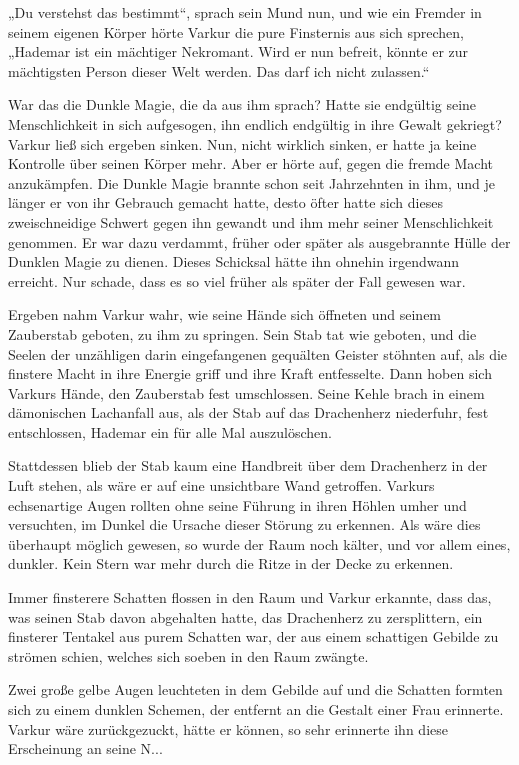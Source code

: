 „Du verstehst das bestimmt“, sprach sein Mund nun, und wie ein Fremder in seinem eigenen Körper hörte Varkur die pure Finsternis aus sich sprechen, „Hademar ist ein mächtiger Nekromant. Wird er nun befreit, könnte er zur mächtigsten Person dieser Welt werden. Das darf ich nicht zulassen.“

War das die Dunkle Magie, die da aus ihm sprach? Hatte sie endgültig seine Menschlichkeit in sich aufgesogen, ihn endlich endgültig in ihre Gewalt gekriegt? Varkur ließ sich ergeben sinken. Nun, nicht wirklich sinken, er hatte ja keine Kontrolle über seinen Körper mehr. Aber er hörte auf, gegen die fremde Macht anzukämpfen. Die Dunkle Magie brannte schon seit Jahrzehnten in ihm, und je länger er von ihr Gebrauch gemacht hatte, desto öfter hatte sich dieses zweischneidige Schwert gegen ihn gewandt und ihm mehr seiner Menschlichkeit genommen. Er war dazu verdammt, früher oder später als ausgebrannte Hülle der Dunklen Magie zu dienen. Dieses Schicksal hätte ihn ohnehin irgendwann erreicht. Nur schade, dass es so viel früher als später der Fall gewesen war.

Ergeben nahm Varkur wahr, wie seine Hände sich öffneten und seinem Zauberstab geboten, zu ihm zu springen. Sein Stab tat wie geboten, und die Seelen der unzähligen darin eingefangenen gequälten Geister stöhnten auf, als die finstere Macht in ihre Energie griff und ihre Kraft entfesselte. Dann hoben sich Varkurs Hände, den Zauberstab fest umschlossen. Seine Kehle brach in einem dämonischen Lachanfall aus, als der Stab auf das Drachenherz niederfuhr, fest entschlossen, Hademar ein für alle Mal auszulöschen.

Stattdessen blieb der Stab kaum eine Handbreit über dem Drachenherz in der Luft stehen, als wäre er auf eine unsichtbare Wand getroffen. Varkurs echsenartige Augen rollten ohne seine Führung in ihren Höhlen umher und versuchten, im Dunkel die Ursache dieser Störung zu erkennen. Als wäre dies überhaupt möglich gewesen, so wurde der Raum noch kälter, und vor allem eines, dunkler. Kein Stern war mehr durch die Ritze in der Decke zu erkennen.

Immer finsterere Schatten flossen in den Raum und Varkur erkannte, dass das, was seinen Stab davon abgehalten hatte, das Drachenherz zu zersplittern, ein finsterer Tentakel aus purem Schatten war, der aus einem schattigen Gebilde zu strömen schien, welches sich soeben in den Raum zwängte.

Zwei große gelbe Augen leuchteten in dem Gebilde auf und die Schatten formten sich zu einem dunklen Schemen, der entfernt an die Gestalt einer Frau erinnerte. Varkur wäre zurückgezuckt, hätte er können, so sehr erinnerte ihn diese Erscheinung an seine N...

